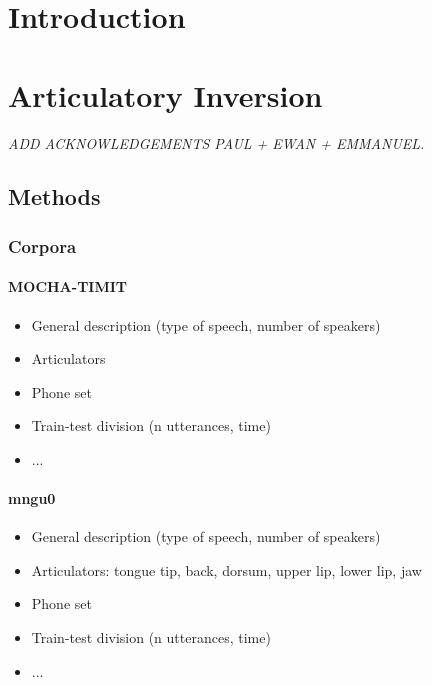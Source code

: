 

\section{Introduction}







\section{Articulatory Inversion}
\small{\textit{{\color{red}ADD ACKNOWLEDGEMENTS PAUL + EWAN + EMMANUEL.\\}}}

\subsection{Methods}
\subsubsection{Corpora}
\paragraph{MOCHA-TIMIT}
\begin{itemize}
\item General description (type of speech, number of speakers)
\item Articulators
\item Phone set
\item Train-test division (n utterances, time)
\item ...
\end{itemize}

\paragraph{mngu0}
\begin{itemize}
\item General description (type of speech, number of speakers)
\item Articulators: tongue {tip, back, dorsum}, upper lip, lower lip, jaw
\item Phone set
\item Train-test division (n utterances, time)
\item ...
\end{itemize}

